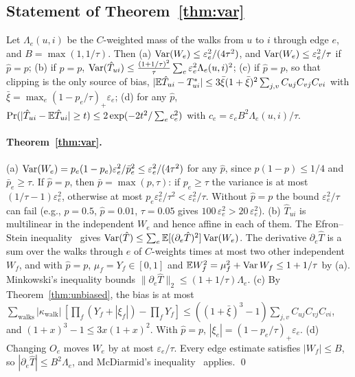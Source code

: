 \subsection*{Statement of Theorem~\ref{thm:var}}
\begin{theorem}\label{thm:var}
Let $\Lambda_e(u,i)$ be the $C$-weighted mass of the walks from $u$ to $i$ through
edge $e$, and $B=\max(1,1/\tau)$. Then
(a) $\operatorname{Var}(W_e)\le\varepsilon_e^2/(4\tau^2)$, and $\operatorname{Var}(W_e)\le\varepsilon_e^2/\tau$ if $\hat p=p$;
(b) if $\hat p=p$, $\operatorname{Var}(\hat T_{ui})\le\frac{(1+1/\tau)^2}{\tau}\sum_e\varepsilon_e^2\Lambda_e(u,i)^2$;
(c) if $\hat p=p$, so that clipping is the only source of bias,
$|\mathbb{E}\hat T_{ui}-T^*_{ui}|\le3\bar\xi(1+\bar\xi)^2\sum_{j,v}C_{uj}C_{vj}C_{vi}$ with
$\bar\xi=\max_e(1-p_e/\tau)_+\varepsilon_e$;
(d) for any $\hat p$, $\Pr(|\hat T_{ui}-\mathbb{E}\hat T_{ui}|\ge t)\le2\exp(-2t^2/\sum_ec_e^2)$ with
$c_e=\varepsilon_eB^2\Lambda_e(u,i)/\tau$.
\end{theorem}

\paragraph{Theorem~\ref{thm:var}.}
(a) $\operatorname{Var}(W_e)=p_e(1-p_e)\varepsilon_e^2/\bar p_e^2\le\varepsilon_e^2/(4\tau^2)$ for any $\hat p$,
since $p(1-p)\le1/4$ and $\bar p_e\ge\tau$. If $\hat p=p$, then $\bar p=\max(p,\tau)$: if
$p_e\ge\tau$ the variance is at most $(1/\tau-1)\varepsilon_e^2$, otherwise at most
$p_e\varepsilon_e^2/\tau^2<\varepsilon_e^2/\tau$. Without $\hat p=p$ the bound $\varepsilon_e^2/\tau$ can
fail (e.g., $p=0.5$, $\hat p=0.01$, $\tau=0.05$ gives $100\,\varepsilon_e^2>20\,\varepsilon_e^2$).
(b) $\hat T_{ui}$ is multilinear in the independent $W_e$ and hence affine in each
of them. The Efron--Stein inequality~\cite{efron1981jackknife} gives
$\operatorname{Var}(\hat T)\le\sum_e\mathbb{E}[(\partial_e\hat T)^2]\operatorname{Var}(W_e)$. The derivative $\partial_e\hat T$
is a sum over the walks through $e$ of $C$-weights times at most two other
independent $W_f$, and with $\hat p=p$, $\mu_f=Y_f\in[0,1]$ and
$\mathbb{E} W_f^2=\mu_f^2+\operatorname{Var} W_f\le1+1/\tau$ by (a). Minkowski's
inequality bounds $\|\partial_e\hat T\|_2\le(1+1/\tau)\Lambda_e$.
(c) By Theorem~\ref{thm:unbiased}, the bias is at most
$\sum_{\text{walks}}|\kappa_{\text{walk}}|\,[\prod_f(Y_f+|\xi_f|)-\prod_fY_f]\le((1+\bar\xi)^3-1)\sum_{j,v}C_{uj}C_{vj}C_{vi}$,
and $(1+x)^3-1\le3x(1+x)^2$. With $\hat p=p$, $|\xi_e|=(1-p_e/\tau)_+\varepsilon_e$.
(d) Changing $O_e$ moves $W_e$ by at most $\varepsilon_e/\tau$. Every edge estimate
satisfies $|W_f|\le B$, so $|\partial_e\hat T|\le B^2\Lambda_e$, and McDiarmid's
inequality~\cite{mcdiarmid1989} applies. \qed

